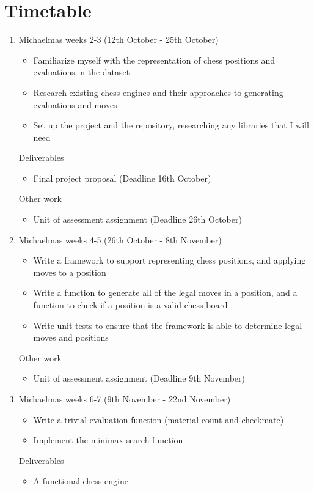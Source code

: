 \documentclass[12pt,a4paper]{article}
\begin{document}
\section*{Timetable}
\begin{enumerate}
    \item Michaelmas weeks 2-3 (12th October - 25th October)
    \begin{itemize}
        \item Familiarize myself with the representation of chess positions and evaluations in the dataset
        \item Research existing chess engines and their approaches to generating evaluations and moves
        \item Set up the project and the repository, researching any libraries that I will need
    \end{itemize}
    Deliverables
    \begin{itemize}
        \item Final project proposal (Deadline 16th October)
    \end{itemize}
    Other work
    \begin{itemize}
        \item Unit of assessment assignment (Deadline 26th October)
    \end{itemize}

    \item Michaelmas weeks 4-5 (26th October - 8th November)
    \begin{itemize}
        \item Write a framework to support representing chess positions, and applying moves to a position
        \item Write a function to generate all of the legal moves in a position, and a function to check if a position is a valid chess board
        \item Write unit tests to ensure that the framework is able to determine legal moves and positions
    \end{itemize}
    Other work
    \begin{itemize}
        \item Unit of assessment assignment (Deadline 9th November)
    \end{itemize}

    \item Michaelmas weeks 6-7 (9th November - 22nd November)
    \begin{itemize}
        \item Write a trivial evaluation function (material count and checkmate)
        \item Implement the minimax search function
    \end{itemize}
    Deliverables
    \begin{itemize}
        \item A functional chess engine
    \end{itemize}


\end{enumerate}
\end{document}
